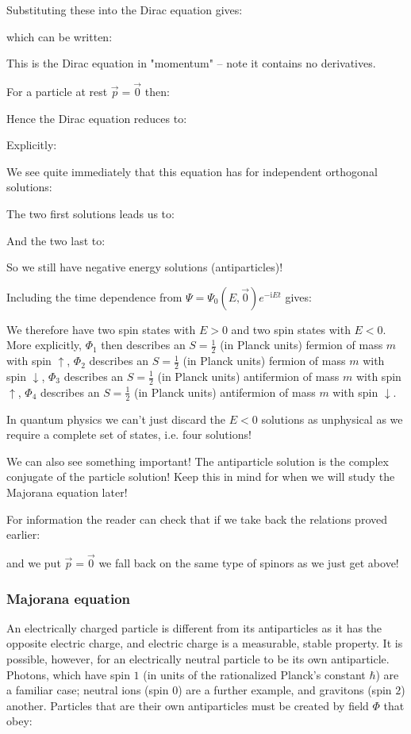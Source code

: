 	Substituting these into the Dirac equation gives:
	
	which can be written:
	
	This is the Dirac equation in "momentum" – note it contains no derivatives.
	
	For a particle at rest $\vec{p}=\vec{0}$ then:
	
	Hence the Dirac equation reduces to:
	
	Explicitly:
	
	We see quite immediately that this equation has for independent orthogonal solutions:
	
	The two first solutions leads us to:
	
	And the two last to:
	
	So we still have negative energy solutions (antiparticles)!
	
	Including the time dependence from $\Psi=\Psi_0(E,\vec{0})e^{-\mathrm{i}Et}$ gives:
	
	We therefore have two spin states with $E>0$ and two spin states with $E<0$. More explicitly, $\Phi_1$ then describes an $S=\frac{1}{2}$ (in Planck units) fermion of mass $m$ with spin $\uparrow$, $\Phi_2$ describes an $S=\frac{1}{2}$ (in Planck units) fermion of mass $m$ with spin $\downarrow$, $\Phi_3$ describes an $S=\frac{1}{2}$ (in Planck units) antifermion of mass $m$ with spin $\uparrow$, $\Phi_4$ describes an $S=\frac{1}{2}$ (in Planck units) antifermion of mass $m$ with spin $\downarrow$.
	
	In quantum physics we can't just discard the $E<0$ solutions as unphysical
as we require a complete set of states, i.e. four solutions!
	
	We can also see something important! The antiparticle solution is the complex conjugate of the particle solution! Keep this in mind for when we will study the Majorana equation later!
	
	For information the reader can check that if we take back the relations proved earlier:
	
	
	
	
	and we put $\vec{p}=\vec{0}$ we fall back on the same type of spinors as we just get above!
	
	\subsubsection{Majorana equation}
	An electrically charged particle is different from its antiparticles as it has the opposite electric charge, and electric charge is a measurable, stable property. It is possible, however, for an electrically neutral particle to be its own antiparticle. Photons, which have spin $1$ (in units of the rationalized Planck's constant $\hbar$) are a familiar case; neutral ions (spin $0$) are a further example, and gravitons (spin $2$) another. Particles that are their own antiparticles must be created by field $\Phi$ that obey:
	
